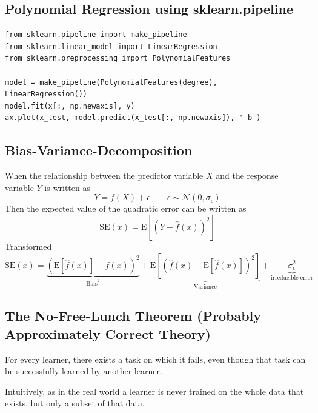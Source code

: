 \documentclass[11pt]{article}
\theoremstyle{definition}
\newcommand*\ev[1]{\mathrel{\text{E}\left[#1\right]}}
\newcommand*\N[1]{\mathcal{N}\left(#1\right)}
\begin{document}
\subsection{Polynomial Regression using sklearn.pipeline}
\begin{verbatim}
from sklearn.pipeline import make_pipeline
from sklearn.linear_model import LinearRegression
from sklearn.preprocessing import PolynomialFeatures

model = make_pipeline(PolynomialFeatures(degree),
LinearRegression())
model.fit(x[:, np.newaxis], y)
ax.plot(x_test, model.predict(x_test[:, np.newaxis]), '-b')
\end{verbatim}

\subsection{Bias-Variance-Decomposition}
When the relationship between the predictor variable $X$ and the response variable $Y$ is written as
\begin{equation*}
	Y=f(X) + \epsilon \qquad \epsilon\sim\N{0,\sigma_{\epsilon}}
\end{equation*}
Then the expected value of the quadratic error can be written as
\begin{equation*}
	\text{SE}(x) = \ev{(Y - \hat{f}(x))^2}
\end{equation*}
Transformed
\begin{equation*}
	\text{SE}(x) = \underbrace{\left(\ev{\hat{f}(x)} - f(x)\right)^2}_{\text{Bias}^2} + \underbrace{\ev{\left(\hat{f}(x) - \ev{\hat{f}(x)}\right)^2}}_{\text{Variance}} + \underbrace{\sigma_{\epsilon}^2}_{\text{irreducible error}}
\end{equation*}

\subsection{The No-Free-Lunch Theorem (Probably Approximately Correct Theory)}
\begin{theorem}
	For every learner, there exists a task on which it fails, even though that task can be successfully learned by another learner.
\end{theorem}
Intuitively, as in the real world a learner is never trained on the whole data that exists, but only a subset of that data.
\end{document}
